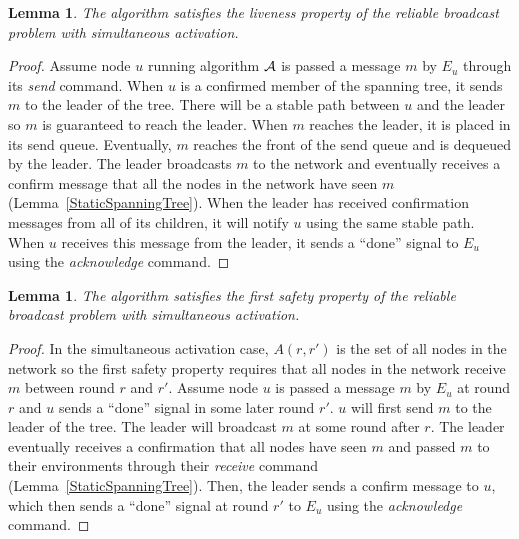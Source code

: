\documentclass[english]{article}
\newtheorem{lemma}[theorem]{Lemma}
\begin{document}
\begin{lemma}
\label{StaticRBLiveness}
The algorithm satisfies the liveness property of the reliable broadcast problem with simultaneous activation.
\end{lemma}
\begin{proof}

Assume node $u$ running algorithm $\cal A$ is passed a message $m$ by $E_u$ through its \textit{send} command. When $u$ is a confirmed member of the spanning tree, it sends $m$ to the leader of the tree. There will be a stable path between $u$ and the leader so $m$ is guaranteed to reach the leader. When $m$ reaches the leader, it is placed in its send queue. Eventually, $m$ reaches the front of the send queue and is dequeued by the leader. The leader broadcasts $m$ to the network and eventually receives a confirm message that all the nodes in the network have seen $m$ (Lemma~\ref{StaticSpanningTree}). When the leader has received confirmation messages from all of its children, it will notify $u$ using the same stable path. When $u$ receives this message from the leader, it sends  a ``done'' signal to $E_u$ using the \textit{acknowledge} command.

\end{proof}


\begin{lemma}
\label{StaticRBSafety1}
The algorithm satisfies the first safety property of the reliable broadcast problem with simultaneous activation.
\end{lemma}
\begin{proof}

In the simultaneous activation case, $A(r,r')$ is the set of all nodes in the network so the first safety property requires that all nodes in the network receive $m$ between round $r$ and $r'$. Assume node $u$ is passed a message $m$ by $E_u$ at round $r$ and $u$ sends  a ``done'' signal in some later round $r'$. $u$ will first send $m$ to the leader of the tree. The leader will broadcast $m$ at some round after $r$. The leader eventually receives a confirmation that all nodes have seen $m$ and passed $m$ to their environments through their \textit{receive} command (Lemma~\ref{StaticSpanningTree}). Then, the leader sends a confirm message to $u$, which then sends  a ``done'' signal at round $r'$ to $E_u$ using the \textit{acknowledge} command. 

\end{proof}
\end{document}
